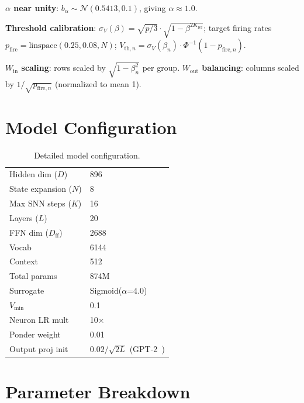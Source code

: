 \documentclass{article}
\newcommand{\vmin}{V_{\text{min}}}
\begin{document}
\textbf{$\alpha$ near unity}: $b_\alpha \sim \mathcal{N}(0.5413, 0.1)$, giving $\alpha \approx 1.0$.

\textbf{Threshold calibration}: $\sigma_V(\beta) = \sqrt{p/3} \cdot \sqrt{1 - \beta^{2K_{\text{ref}}}}$; target firing rates $p_{\text{fire}} = \text{linspace}(0.25, 0.08, N)$; $V_{\text{th},n} = \sigma_V(\beta_n) \cdot \Phi^{-1}(1 - p_{\text{fire},n})$.

\textbf{$W_{\text{in}}$ scaling}: rows scaled by $\sqrt{1 - \beta_n^2}$ per group.
\textbf{$W_{\text{out}}$ balancing}: columns scaled by $1/\sqrt{p_{\text{fire},n}}$ (normalized to mean 1).

\section{Model Configuration}
\label{app:config}

\begin{table}[H]
\centering
\small
\caption{Detailed model configuration.}
\begin{tabular}{ll}
\toprule
Hidden dim ($D$) & 896 \\ State expansion ($N$) & 8 \\ Max SNN steps ($K$) & 16 \\
Layers ($L$) & 20 \\ FFN dim ($D_{\text{ff}}$) & 2688 \\ Vocab & 6144 \\ Context & 512 \\
Total params & 874M \\
\midrule
Surrogate & Sigmoid($\alpha$=4.0) \\ $\vmin$ & 0.1 \\ Neuron LR mult & 10$\times$ \\ Ponder weight & 0.01 \\
Output proj init & $0.02/\sqrt{2L}$ (GPT-2~\citep{radford2019language}) \\
\bottomrule
\end{tabular}
\end{table}

\section{Parameter Breakdown}
\label{app:params}
\end{document}
